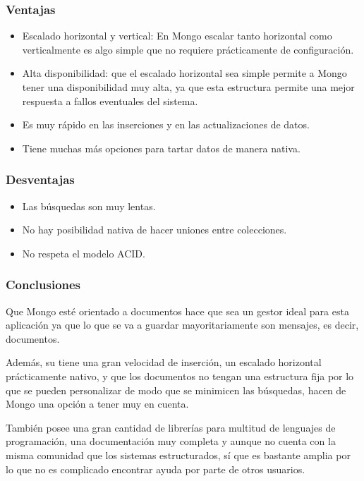 \subsubsection{Ventajas}
\begin{itemize}
    \item Escalado horizontal y vertical: En Mongo escalar tanto horizontal como verticalmente es algo simple que no requiere prácticamente de configuración. 
    \item Alta disponibilidad: que el escalado horizontal sea simple permite a Mongo tener una disponibilidad muy alta, ya que esta estructura permite una mejor respuesta a fallos eventuales del sistema. 
    \item Es muy rápido en las inserciones y en las actualizaciones de datos. 
    \item Tiene muchas más opciones para tartar datos de manera nativa. 
\end{itemize}

\subsubsection{Desventajas}
\begin{itemize}
    \item Las búsquedas son muy lentas.
    \item No hay posibilidad nativa de hacer uniones entre colecciones. 
    \item No respeta el modelo ACID.
\end{itemize}

\subsubsection{Conclusiones}
Que Mongo esté orientado a documentos hace que sea un gestor ideal para esta aplicación ya que lo que se va a guardar mayoritariamente son mensajes, es decir, documentos. 

Además, su tiene una gran velocidad de inserción, un escalado horizontal prácticamente nativo, y que los documentos no tengan una estructura fija por lo que se pueden personalizar de modo que se minimicen las búsquedas, hacen de Mongo una opción a tener muy en cuenta. 

También posee una gran cantidad de librerías para multitud de lenguajes de programación, una documentación muy completa y aunque no cuenta con la misma comunidad que los sistemas estructurados, sí que es bastante amplia por lo que no es complicado encontrar ayuda por parte de otros usuarios. 

